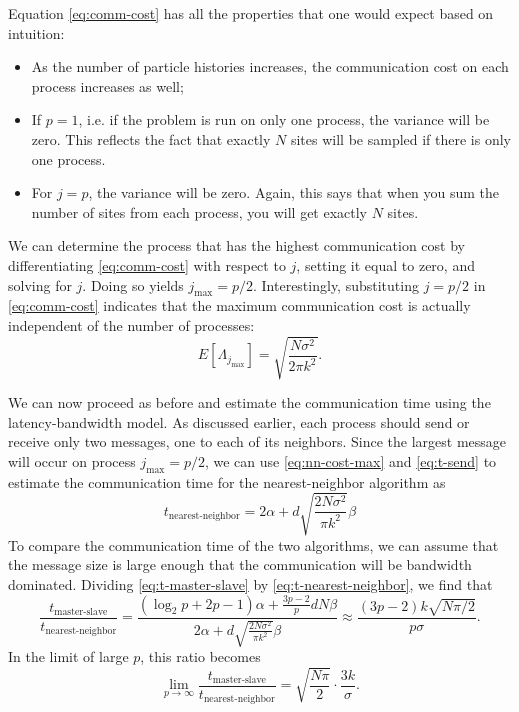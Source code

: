 Equation \eqref{eq:comm-cost} has all the properties that one would expect based
on intuition:
\begin{itemize}
\item As the number of particle histories increases, the communication cost on
  each process increases as well;
\item If $p=1$, i.e. if the problem is run on only one process, the variance
  will be zero. This reflects the fact that exactly $N$ sites will be sampled if
  there is only one process.
\item For $j=p$, the variance will be zero. Again, this says that when you sum
  the number of sites from each process, you will get exactly $N$ sites.
\end{itemize}
We can determine the process that has the highest communication cost by
differentiating \eqref{eq:comm-cost} with respect to $j$, setting it equal to
zero, and solving for $j$. Doing so yields $j_{\text{max}} =
p/2$. Interestingly, substituting $j = p/2$ in \eqref{eq:comm-cost} indicates
that the maximum communication cost is actually independent of the number of
processes:
\begin{equation}
  \label{eq:nn-cost-max}
  E \left [ \Lambda_{j_{\text{max}}} \right ] = \sqrt{ \frac{N\sigma^2}{2\pi
      k^2}}.
\end{equation}

We can now proceed as before and estimate the communication time using the
latency-bandwidth model. As discussed earlier, each process should send or
receive only two messages, one to each of its neighbors. Since the largest
message will occur on process $j_{\text{max}} = p/2$, we can use
\eqref{eq:nn-cost-max} and \eqref{eq:t-send} to estimate the communication time
for the nearest-neighbor algorithm as
\begin{equation}
  \label{eq:t-nearest-neighbor}
  t_{\text{nearest-neighbor}} = 2\alpha + d\sqrt{\frac{2N\sigma^2}{\pi k^2}} \beta
\end{equation}
To compare the communication time of the two algorithms, we can assume that the
message size is large enough that the communication will be bandwidth
dominated. Dividing \eqref{eq:t-master-slave} by \eqref{eq:t-nearest-neighbor},
we find that
\begin{equation}
  \frac{t_{\text{master-slave}}}{t_{\text{nearest-neighbor}}} = \frac{\left (
    \log_2 p + 2p - 1 \right ) \alpha + \frac{3p-2}{p} dN\beta}{2\alpha +
    d\sqrt{\frac{2N\sigma^2}{\pi k^2}} \beta} \approx \frac{ \left ( 3p - 2
    \right ) k \sqrt{N\pi/2}}{ p\sigma }.
\end{equation}
In the limit of large $p$, this ratio becomes
\begin{equation}
  \label{eq:t-ratio-limit}
  \lim_{p\rightarrow\infty}
  \frac{t_{\text{master-slave}}}{t_{\text{nearest-neighbor}}} =
  \sqrt{\frac{N\pi}{2}} \cdot \frac{3k}{\sigma}.
\end{equation}

